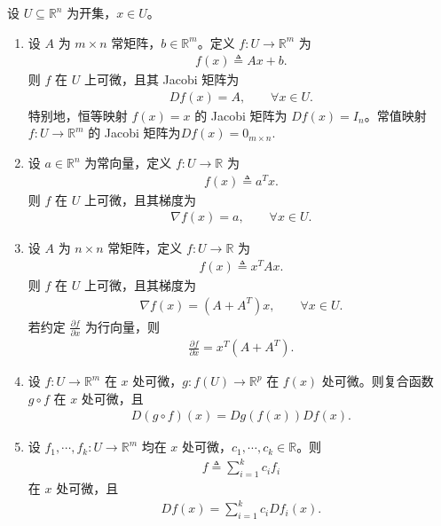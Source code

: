 \documentclass[../../main.tex]{subfiles}
\begin{document}
\begin{theorem}[向量值函数求导的基本性质]\label{theorem:向量求导基本性质}
设 $U\subseteq\mathbb{R}^n$ 为开集，$x\in U$。
\begin{enumerate}[(1)]
\item 设 $A$ 为 $m\times n$ 常矩阵，$b\in\mathbb{R}^m$。定义 $f:U\to\mathbb{R}^m$ 为
\begin{align*}
f(x)\triangleq Ax+b.
\end{align*}
则 $f$ 在 $U$ 上可微，且其 Jacobi 矩阵为
\begin{align*}
Df(x)=A,\qquad \forall x\in U.
\end{align*}
特别地，恒等映射 $f(x)=x$ 的 Jacobi 矩阵为 $Df(x)=I_n$。常值映射$f:U\to\mathbb{R}^m$ 的 Jacobi 矩阵为$Df(x)=0_{m\times n}$.

\item 设 $a\in\mathbb{R}^n$ 为常向量，定义 $f:U\to\mathbb{R}$ 为
\begin{align*}
f(x)\triangleq a^T x.
\end{align*}
则 $f$ 在 $U$ 上可微，且其梯度为
\begin{align*}
\nabla f(x)=a,\qquad \forall x\in U.
\end{align*}

\item 设 $A$ 为 $n\times n$ 常矩阵，定义 $f:U\to\mathbb{R}$ 为
\begin{align*}
f(x)\triangleq x^T A x.
\end{align*}
则 $f$ 在 $U$ 上可微，且其梯度为
\begin{align*}
\nabla f(x)=(A+A^T)x,\qquad \forall x\in U.
\end{align*}
若约定 $\frac{\partial f}{\partial x}$ 为行向量，则
\begin{align*}
\frac{\partial f}{\partial x}=x^T(A+A^T).
\end{align*}

\item\label{theorem:向量求导基本性质-4} 设 $f:U\to\mathbb{R}^m$ 在 $x$ 处可微，$g:f(U)\to\mathbb{R}^p$ 在 $f(x)$ 处可微。则复合函数 $g\circ f$ 在 $x$ 处可微，且
\begin{align*}
D(g\circ f)(x)=Dg(f(x))Df(x).
\end{align*}

\item 设 $f_1,\cdots,f_k:U\to\mathbb{R}^m$ 均在 $x$ 处可微，$c_1,\cdots,c_k\in\mathbb{R}$。则
\begin{align*}
f\triangleq\sum\limits_{i=1}^k c_i f_i
\end{align*}
在 $x$ 处可微，且
\begin{align*}
Df(x)=\sum\limits_{i=1}^k c_i Df_i(x).
\end{align*}
\end{enumerate}
\end{theorem}
\end{document}
